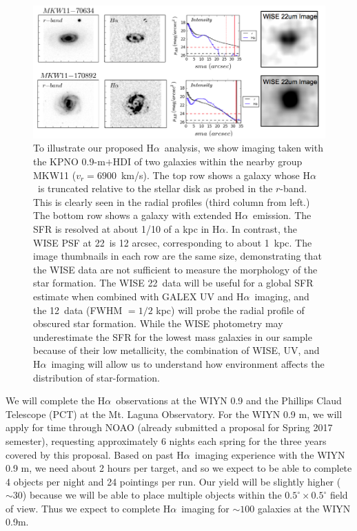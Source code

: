 \documentclass[11pt, preprint]{aastex}
\newcommand{\ha}{H$\alpha$}
\begin{document}
\vspace{-0.3cm}
\begin{figure}[h]
\centering
\includegraphics[width=.85\textwidth]{HalphaProfileWISE.png}
\vspace{-0.3cm}
\caption{\small
To illustrate our proposed \ha \  analysis, we show
imaging taken with the KPNO 0.9-m$+$HDI of two galaxies within the
nearby group  MKW11 ($v_r = 6900$~km/s). The top row shows a
galaxy whose \ha \ is truncated
relative to the stellar disk as
probed in the $r$-band. This is clearly seen in the radial profiles (third column from left.)  The bottom row shows a galaxy with extended
\ha \ emission.  The SFR is resolved  at about 1/10 of a kpc in \ha. In
contrast, the WISE PSF at 22\micron\ is 12 arcsec, corresponding to about 1~kpc. The image thumbnails in each row are the same size, demonstrating
that the WISE data are not sufficient to measure the 
morphology of the star formation.  The WISE 22\micron\ data will be useful for a global SFR estimate when combined with GALEX UV and \ha\ imaging, and the 12\micron\ data (FWHM $=1/2$ kpc) will probe the radial profile of obscured star formation.  While the WISE photometry may
underestimate the SFR for  the lowest mass galaxies in our sample
because of their low metallicity, the combination of WISE, UV, and \ha\ imaging will allow us to understand how environment affects the distribution of star-formation.
}
\label{fig3}
\end{figure}


We will complete the \ha \ observations at the WIYN 0.9 and the Phillips Claud Telescope (PCT) at the Mt. Laguna Observatory.  For the WIYN 0.9 m, we will apply for time through NOAO (already submitted a proposal for Spring 2017 semester), requesting
approximately 6 nights each spring for the three years covered by this
proposal.  Based on past \ha \ imaging experience with the WIYN 0.9 m,
we need about 2 hours per target, and so we expect to be able to
complete 4 objects per night and 24 pointings per run.  Our yield will 
be slightly higher ($\sim 30$) because we will be able to place multiple objects within
the $0.5^\circ \times 0.5^\circ$ field of view.  Thus we expect to
complete \ha \ imaging for
$\sim 100$ galaxies at the WIYN 0.9m. 
\end{document}
